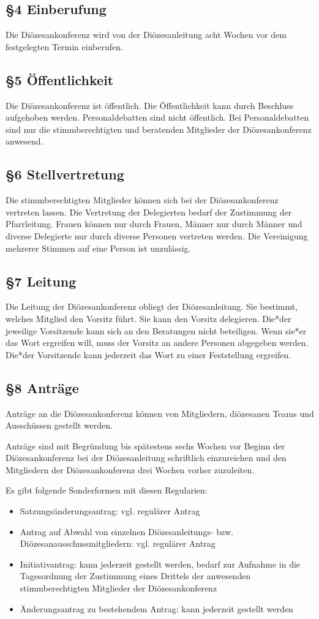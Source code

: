 \documentclass[12pt]{report}
\begin{document}
\begin{flushleft}
\subsection*{§4 Einberufung}
Die Diözesankonferenz wird von der Diözesanleitung acht Wochen vor dem festgelegten Termin einberufen.
\subsection*{§5 Öffentlichkeit}
Die Diözesankonferenz ist öffentlich. Die Öffentlichkeit kann durch Beschluss aufgehoben werden.
Personaldebatten sind nicht öffentlich. Bei Personaldebatten sind nur die stimmberechtigten und beratenden
Mitglieder der Diözesankonferenz anwesend.
\subsection*{§6 Stellvertretung}
Die stimmberechtigten Mitglieder können sich bei der Diözesankonferenz vertreten lassen. Die Vertretung
der Delegierten bedarf der Zustimmung der Pfarrleitung. Frauen können nur durch Frauen, Männer nur durch
Männer und diverse Delegierte nur durch diverse Personen vertreten werden. Die Vereinigung mehrerer Stimmen auf eine Person ist unzulässig.
\subsection*{§7 Leitung}
Die Leitung der Diözesankonferenz obliegt der Diözesanleitung. Sie bestimmt, welches Mitglied den Vorsitz
führt. Sie kann den Vorsitz delegieren. Die*der jeweilige Vorsitzende kann sich an den Beratungen nicht beteiligen.
Wenn sie*er das Wort ergreifen will, muss der Vorsitz an andere Personen abgegeben werden.
Die*der Vorsitzende kann jederzeit das Wort zu einer Feststellung ergreifen.
\subsection*{§8 Anträge}
Anträge an die Diözesankonferenz können von Mitgliedern, diözesanen Teams und Ausschüssen gestellt werden.

Anträge sind mit Begründung bis spätestens sechs Wochen vor Beginn der Diözesankonferenz bei der Diözesanleitung
schriftlich einzureichen und den Mitgliedern der Diözesankonferenz drei Wochen vorher zuzuleiten.

Es gibt folgende Sonderformen mit diesen Regularien:
\begin{itemize}
  \item Satzungsänderungsantrag: vgl. regulärer Antrag
  \item Antrag auf Abwahl von einzelnen Diözesanleitungs- bzw. Diözesanausschussmitgliedern:
        vgl. regulärer Antrag
  \item Initiativantrag: kann jederzeit gestellt werden, bedarf zur Aufnahme in die Tagesordnung der Zustimmung
        eines Drittels der anwesenden stimmberechtigten Mitglieder der Diözesankonferenz
  \item Änderungsantrag zu bestehendem Antrag: kann jederzeit gestellt werden
\end{itemize}


\end{flushleft}
\end{document}

